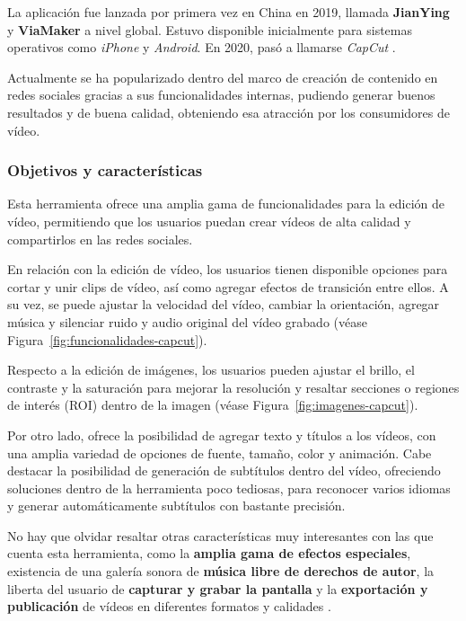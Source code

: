 La aplicación fue lanzada por primera vez en China en 2019, llamada \textbf{JianYing} y \textbf{ViaMaker} a nivel global. Estuvo disponible inicialmente para 
sistemas operativos como \textit{iPhone} y \textit{Android}. En 2020, pasó a llamarse \textit{CapCut} \cite{capcut-wikipedia}.

Actualmente se ha popularizado dentro del marco de creación de contenido en redes sociales gracias 
a sus funcionalidades internas, pudiendo generar buenos resultados y de buena calidad, obteniendo 
esa atracción por los consumidores de vídeo.

\subsubsection{Objetivos y características}
Esta herramienta ofrece una amplia gama de funcionalidades para la edición de vídeo, permitiendo que los 
usuarios puedan crear vídeos de alta calidad y compartirlos en las redes sociales.

En relación con la edición de vídeo, los usuarios tienen disponible opciones para cortar y unir 
clips de vídeo, así como agregar efectos de transición entre ellos. A su vez, se puede ajustar la 
velocidad del vídeo, cambiar la orientación, agregar música y silenciar ruido y audio original 
del vídeo grabado (véase Figura~\ref{fig:funcionalidades-capcut}).

Respecto a la edición de imágenes, los usuarios pueden ajustar el brillo, el contraste y la 
saturación para mejorar la resolución y resaltar secciones o regiones de interés 
(ROI) dentro de la imagen (véase Figura~\ref{fig:imagenes-capcut}).

Por otro lado, ofrece la posibilidad de agregar texto y títulos a los vídeos, con una amplia variedad 
de opciones de fuente, tamaño, color y animación. Cabe destacar la posibilidad de generación de subtítulos 
dentro del vídeo, ofreciendo soluciones dentro de la herramienta poco tediosas, para reconocer varios idiomas 
y generar automáticamente subtítulos con bastante precisión.

No hay que olvidar resaltar otras características muy interesantes con las que cuenta esta herramienta, 
como la \textbf{amplia gama de efectos especiales}, existencia de una galería sonora de 
\textbf{música libre de derechos de autor}, la liberta del usuario de \textbf{capturar y grabar la pantalla} 
y la \textbf{exportación y publicación} de vídeos en diferentes formatos y calidades \cite{capcut-caracteristicas}.

